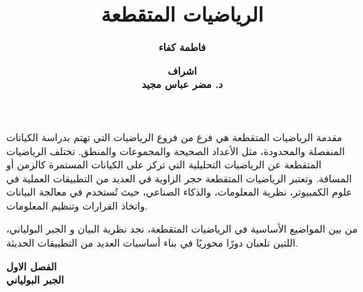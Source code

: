 


	\title{الرياضيات المتقطعة}
	\author{\textbf{فاطمة كفاء}}
	\date{\textbf{
اشراف \\
د. مضر عباس مجيد}}

\begin{frame}
	\maketitle
\end{frame}
\timesfont

\begin{frame}{مقدمة}
	\pause
	الرياضيات المتقطعة هي فرع من فروع الرياضيات التي تهتم بدراسة الكيانات المنفصلة والمحدودة، مثل الأعداد الصحيحة والمجموعات والمنطق. تختلف الرياضيات المتقطعة عن الرياضيات التحليلية التي تركز على الكيانات المستمرة كالزمن أو المسافة. وتعتبر الرياضيات المتقطعة حجر الزاوية في العديد من التطبيقات العملية في علوم الكمبيوتر، نظرية المعلومات، والذكاء الصناعي، حيث تُستخدم في معالجة البيانات واتخاذ القرارات وتنظيم المعلومات.\\
	\noindent
	
	\pause
	من بين المواضيع الأساسية في الرياضيات المتقطعة، نجد نظرية البيان و الجبر البولياني، اللتين تلعبان دورًا محوريًا في بناء أساسيات العديد من التطبيقات الحديثة.\\
\end{frame}

\begin{frame}
	\begin{center}
		\Huge
		\textbf{الفصل الاول}\\[10pt]
		\textbf{الجبر البولياني}
	\end{center}
\end{frame}

